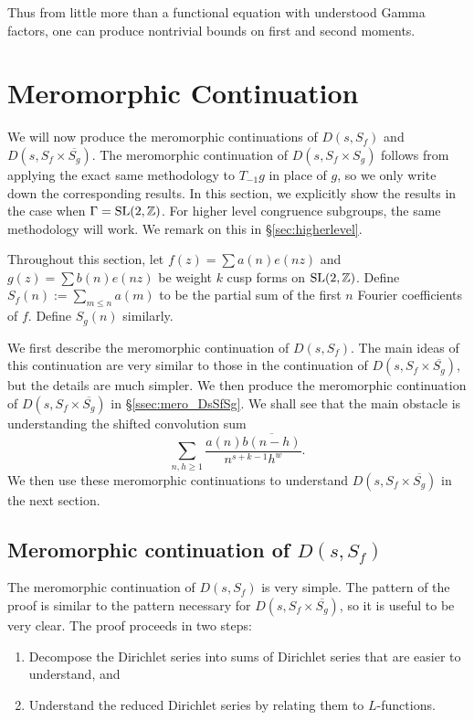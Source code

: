 Thus from little more than a functional equation with understood Gamma factors, one can
produce nontrivial bounds on first and second moments.



\section{Meromorphic Continuation}


We will now produce the meromorphic continuations of $D(s, S_f)$ and $D(s, S_f \times
\overline{S_g})$.
The meromorphic continuation of $D(s, S_f \times S_g)$ follows from applying the exact
same methodology to $T_{-1} g$ in place of $g$, so we only write down the corresponding
results.
In this section, we explicitly show the results in the case when $\Gamma = \operatorname{SL}(2,
\mathbb{Z})$.
For higher level congruence subgroups, the same methodology will work.
We remark on this in \S\ref{sec:higherlevel}.


Throughout this section, let $f(z) = \sum a(n) e(nz)$ and $g(z) = \sum b(n) e(nz)$ be
weight $k$ cusp forms on $\operatorname{SL}(2, \mathbb{Z})$.
Define $S_f(n) := \sum_{m \leq n} a(m)$ to be the partial sum of the first $n$ Fourier
coefficients of $f$.
Define $S_g(n)$ similarly.


We first describe the meromorphic continuation of $D(s, S_f)$.
The main ideas of this continuation are very similar to those in the continuation of $D(s,
S_f \times \overline{S_g})$, but the details are much simpler.
We then produce the meromorphic continuation of $D(s, S_f \times \overline{S_g})$ in
\S\ref{ssec:mero_DsSfSg}.
We shall see that the main obstacle is understanding the shifted convolution sum
\begin{equation}
  \sum_{n,h \geq 1} \frac{a(n)\overline{b(n-h)}}{n^{s+k-1} h^w}.
\end{equation}
We then use these meromorphic continuations to understand $D(s, S_f \times
\overline{S_g})$ in the next section.



\subsection{Meromorphic continuation of $D(s, S_f)$}


The meromorphic continuation of $D(s, S_f)$ is very simple.
The pattern of the proof is similar to the pattern necessary for $D(s, S_f \times
\overline{S_g})$, so it is useful to be very clear.
The proof proceeds in two steps:
\begin{enumerate}
  \item Decompose the Dirichlet series into sums of Dirichlet series that are easier to
    understand, and
  \item Understand the reduced Dirichlet series by relating them to $L$-functions.
\end{enumerate}


